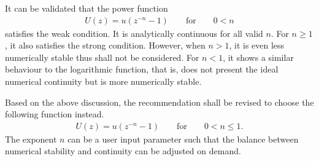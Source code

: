 It can be validated that the power function
\begin{gather}
    U\left(z\right)=u\left(z^{-n}-1\right)\qquad\text{for}\qquad{}0<n
\end{gather}
satisfies the weak condition.
It is analytically continuous for all valid $n$.
For $n\geqslant1$, it also satisfies the strong condition.
However, when $n>1$, it is even less numerically stable thus shall not be considered.
For $n<1$, it shows a similar behaviour to the logarithmic function, that is, does not present the ideal numerical continuity but is more numerically stable.

Based on the above discussion, the recommendation shall be revised to choose the following function instead.
\begin{gather}
    U\left(z\right)=u\left(z^{-n}-1\right)\qquad\text{for}\qquad{}0<n\leqslant1.
\end{gather}
The exponent $n$ can be a user input parameter such that the balance between numerical stability and continuity can be adjusted on demand.